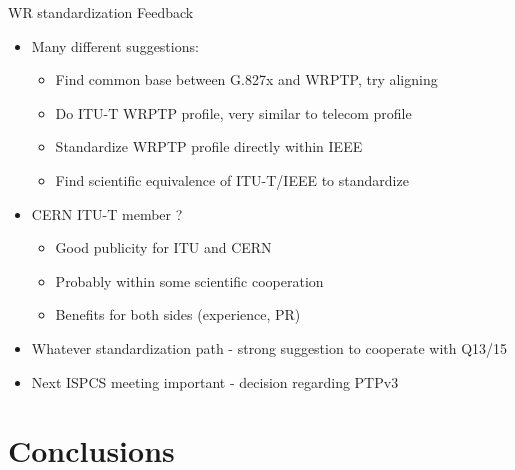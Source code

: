 \documentclass[compress,red]{beamer}
\begin{document}
\begin{frame}{WR standardization Feedback}

  \begin{itemize}
    \item Many different suggestions:
	\begin{itemize}
	  \item Find common base between G.827x and WRPTP, try aligning
	  \item Do ITU-T WRPTP profile, very similar to telecom profile
	  \item Standardize WRPTP profile directly within IEEE
	  \item Find scientific equivalence of ITU-T/IEEE to standardize
	\end{itemize}    
    \item CERN ITU-T member ?
	\begin{itemize}
	  \item Good publicity for ITU and CERN
	  \item Probably within some scientific cooperation
	  \item Benefits for both sides (experience, PR)
	\end{itemize}    
    \item Whatever standardization path - strong suggestion to cooperate with Q13/15
    \item Next ISPCS meeting important - decision regarding PTPv3
  \end{itemize}


\end{frame}
\section{Conclusions}
\end{document}
